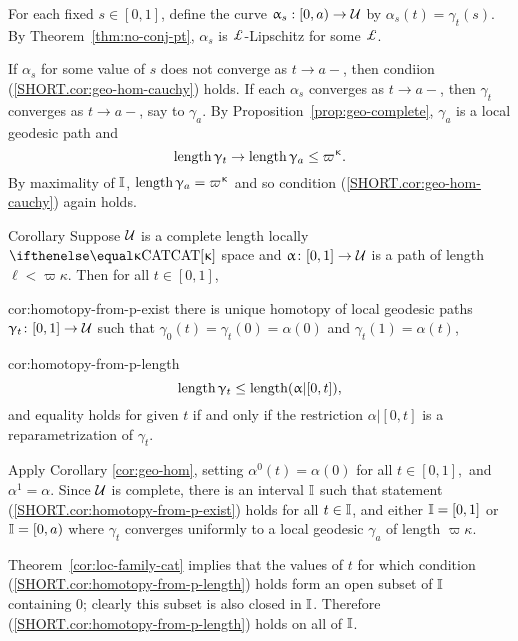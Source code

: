 For each fixed $s\in [0,1]$, define the curve $\alpha_s:[0,a)\to\spc{U}$ by $\alpha_s(t)=\gamma_t(s)$. 
By Theorem~\ref{thm:no-conj-pt}, 
$\alpha_s$ is $ \Lip$-Lipschitz for some $\Lip$.  

If $\alpha_s$  for some value of $s$ does not converge as $t\to a-$, then condiion (\ref{SHORT.cor:geo-hom-cauchy}) holds.  If each $\alpha_s$  converges as $t\to a-$,  
 then $ \gamma_t$ converges as $t\to a-$, say to $\gamma_a$.
By  Proposition~\ref{prop:geo-complete}, $\gamma_a$ is a local geodesic path and\[\length\gamma_t\to\length\gamma_a\le \varpi\kappa.\]
By maximality of $\mathbb{I}$, $\length\gamma_a=\varpi\kappa$ and so condition (\ref{SHORT.cor:geo-hom-cauchy}) again holds.
\qeds

\begin{thm}{Corollary}\label{cor:homotopy-from-p}
Suppose $\mathcal{U}$ is a complete length  locally $\CAT\kappa$ space 
and $\alpha\:[0,1]\to \spc{U}$ is a path of length $\ell<\varpi\kappa$.
Then  for all $t\in[0,1]$,

\begin{subthm}{cor:homotopy-from-p-exist}
there is unique homotopy of local geodesic paths $\gamma_t\:[0,1]\to \spc{U}$
such that $\gamma_0(t)=\gamma_t(0)=\alpha(0)$ and $\gamma_t(1)=\alpha(t)$,
\end{subthm}

\begin{subthm}{cor:homotopy-from-p-length}
\[\length\gamma_t\le\length(\alpha|[0,t]),\]
and  equality holds for given $t$ if and only if the restriction $\alpha|[0,t]$ is a reparametrization of $\gamma_t$.
\end{subthm}
\end{thm}

Apply Corollary \ref{cor:geo-hom}, setting $\alpha^0(t)=\alpha(0)$ for all $t\in [0,1],$ and $\alpha^1=\alpha$. Since $\mathcal{U}$ is complete,  there is an interval $\mathbb{I}$ such that statement (\ref{SHORT.cor:homotopy-from-p-exist}) holds for all $t\in\II$, and either $\mathbb{I}=[0,1]$ or $\mathbb{I}=[0,a)$ where $\gamma_t$ converges uniformly to a local geodesic $\gamma_a$ of length $\varpi\kappa$.

Theorem~\ref{cor:loc-family-cat} implies that the values of $t$ for which condition (\ref{SHORT.cor:homotopy-from-p-length}) holds form an open subset of $\mathbb{I}$ containing $0$; clearly this subset is also closed in $\mathbb{I}$. Therefore (\ref{SHORT.cor:homotopy-from-p-length}) holds on all of $\mathbb{I}$. 
 
